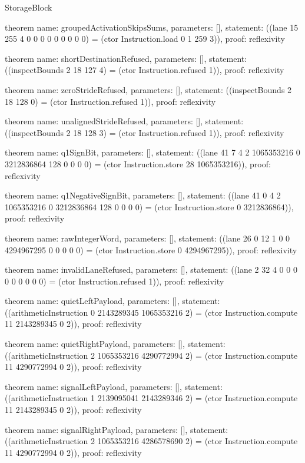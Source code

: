 \begin{lexlean}{StorageBlock}
\begin{semanticmodule}
theorem{
  name: groupedActivationSkipsSums,
  parameters: [],
  statement: ((lane 15 255 4 0 0 0 0 0 0 0 0 0) = (ctor Instruction.load 0 1 259 3)),
  proof: reflexivity{}
}

theorem{
  name: shortDestinationRefused,
  parameters: [],
  statement: ((inspectBounds 2 18 127 4) = (ctor Instruction.refused 1)),
  proof: reflexivity{}
}

theorem{
  name: zeroStrideRefused,
  parameters: [],
  statement: ((inspectBounds 2 18 128 0) = (ctor Instruction.refused 1)),
  proof: reflexivity{}
}

theorem{
  name: unalignedStrideRefused,
  parameters: [],
  statement: ((inspectBounds 2 18 128 3) = (ctor Instruction.refused 1)),
  proof: reflexivity{}
}

theorem{
  name: q1SignBit,
  parameters: [],
  statement: ((lane 41 7 4 2 1065353216 0 3212836864 128 0 0 0 0) = (ctor Instruction.store 28 1065353216)),
  proof: reflexivity{}
}

theorem{
  name: q1NegativeSignBit,
  parameters: [],
  statement: ((lane 41 0 4 2 1065353216 0 3212836864 128 0 0 0 0) = (ctor Instruction.store 0 3212836864)),
  proof: reflexivity{}
}

theorem{
  name: rawIntegerWord,
  parameters: [],
  statement: ((lane 26 0 12 1 0 0 4294967295 0 0 0 0 0) = (ctor Instruction.store 0 4294967295)),
  proof: reflexivity{}
}

theorem{
  name: invalidLaneRefused,
  parameters: [],
  statement: ((lane 2 32 4 0 0 0 0 0 0 0 0 0) = (ctor Instruction.refused 1)),
  proof: reflexivity{}
}

theorem{
  name: quietLeftPayload,
  parameters: [],
  statement: ((arithmeticInstruction 0 2143289345 1065353216 2) = (ctor Instruction.compute 11 2143289345 0 2)),
  proof: reflexivity{}
}

theorem{
  name: quietRightPayload,
  parameters: [],
  statement: ((arithmeticInstruction 2 1065353216 4290772994 2) = (ctor Instruction.compute 11 4290772994 0 2)),
  proof: reflexivity{}
}

theorem{
  name: signalLeftPayload,
  parameters: [],
  statement: ((arithmeticInstruction 1 2139095041 2143289346 2) = (ctor Instruction.compute 11 2143289345 0 2)),
  proof: reflexivity{}
}

theorem{
  name: signalRightPayload,
  parameters: [],
  statement: ((arithmeticInstruction 2 1065353216 4286578690 2) = (ctor Instruction.compute 11 4290772994 0 2)),
  proof: reflexivity{}
}


\end{semanticmodule}
\end{lexlean}
